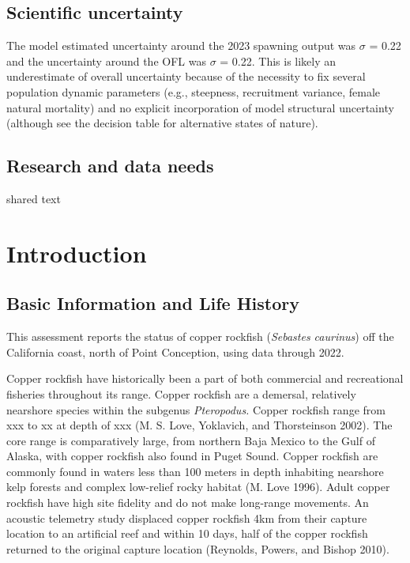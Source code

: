 \documentclass[11pt,
  english,
  letterpaper,
]{article}
\begin{document}
\hypertarget{scientific-uncertainty}{%
\subsection*{Scientific uncertainty}\label{scientific-uncertainty}}

The model estimated uncertainty around the 2023 spawning output was \(\sigma\) = 0.22 and the uncertainty around the OFL was \(\sigma\) = 0.22. This is likely an underestimate of overall uncertainty because of the necessity to fix several population dynamic parameters (e.g., steepness, recruitment variance, female natural mortality) and no explicit incorporation of model structural uncertainty (although see the decision table for alternative states of nature).

\hypertarget{research-and-data-needs}{%
\subsection*{Research and data needs}\label{research-and-data-needs}}

shared text

\pagebreak
\setlength{\parskip}{5mm plus1mm minus1mm}
\setcounter{page}{1}
\renewcommand{\thefigure}{\arabic{figure}}
\renewcommand{\thetable}{\arabic{table}}
\setcounter{table}{0}
\setcounter{figure}{0}

\hypertarget{introduction}{%
\section{Introduction}\label{introduction}}

\hypertarget{basic-information-and-life-history}{%
\subsection{Basic Information and Life History}\label{basic-information-and-life-history}}

This assessment reports the status of copper rockfish (\emph{Sebastes caurinus}) off the California coast, north of Point Conception, using data through 2022.

Copper rockfish have historically been a part of both commercial and recreational fisheries throughout its range. Copper rockfish are a demersal, relatively nearshore species within the subgenus \emph{Pteropodus.} Copper rockfish range from xxx to xx at depth of xxx (M. S. Love, Yoklavich, and Thorsteinson 2002). The core range is comparatively large, from northern Baja Mexico to the Gulf of Alaska, with copper rockfish also found in Puget Sound. Copper rockfish are commonly found in waters less than 100 meters in depth inhabiting nearshore kelp forests and complex low-relief rocky habitat (M. Love 1996). Adult copper rockfish have high site fidelity and do not make long-range movements. An acoustic telemetry study displaced copper rockfish 4km from their capture location to an artificial reef and within 10 days, half of the copper rockfish returned to the original capture location (Reynolds, Powers, and Bishop 2010).
\end{document}
